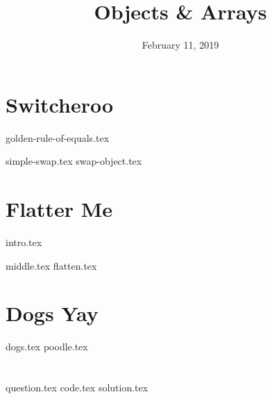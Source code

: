 \documentclass[11pt]{exam}
\title{Objects \& Arrays}
\date{February 11, 2019}
\begin{document}
\maketitle

\printanswers

\section{Switcheroo}
{golden-rule-of-equals.tex}
\begin{questions}
{simple-swap.tex}
{swap-object.tex}

\end{questions}

\newpage
\section{Flatter Me}
{intro.tex}
\begin{questions}
{middle.tex}
{flatten.tex}
\end{questions}

\section{Dogs Yay}
\begin{questions}
{dogs.tex}
{poodle.tex}
\end{questions}

\clearpage

\section{}
\begin{questions}
{question.tex}
{code.tex}
{solution.tex}
\end{questions}
\end{document}
